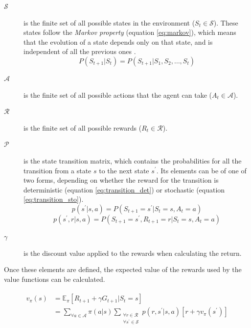 \begin{description}
    \item[$\mathcal{S}$] is the finite set of all possible states in the environment ($S_t \in \mathcal{S}$). These states follow the \textit{Markov property} (equation \ref{eq:markov}), which means that the evolution of a state depends only on that state, and is independent of all the previous ones \cite{Sutton:2018}.
    \begin{equation}
    \label{eq:markov}
        P(S_{t+1}|S_t) = P(S_{t+1}|S_1, S_2, \ldots, S_t)
    \end{equation}
    \item[$\mathcal{A}$] is the finite set of all possible actions that the agent can take ($A_t \in \mathcal{A}$).
    \item[$\mathcal{R}$] is the finite set of all possible rewards ($R_t \in \mathcal{R}$). 
    \item[$\mathcal{P}$] is the state transition matrix, which contains the probabilities for all the transition from a state $s$ to the next state $s^\prime$. Its elements can be of one of two forms, depending on whether the reward for the transition is deterministic (equation \ref{eq:transition_det}) or stochastic (equation \ref{eq:transition_sto}).
    \begin{equation}
    \label{eq:transition_det}
        p(s^\prime|s, a) = P(S_{t+1} = s^\prime|S_t = s, A_t = a)
    \end{equation}
    \begin{equation}
    \label{eq:transition_sto}
        p(s^\prime, r|s, a) = P(S_{t+1} = s^\prime, R_{t+1} = r|S_t = s, A_t = a)
    \end{equation}
    \item[$\gamma$] is the discount value applied to the rewards when calculating the return.
\end{description}

Once these elements are defined, the expected value of the rewards used by the value functions can be calculated.

\begin{align}
\begin{split}
    \label{eq:bellman_state}
    v_\pi(s) &= \mathbb{E}_\pi[R_{t+1} + \gamma G_{t+1}|S_t = s] \\
    &= \sum_{\forall a \in \mathcal{A}}{\pi(a|s)} \sum_{\substack{\forall r \in \mathcal{R} \\ \forall s^\prime \in \mathcal{S}}}{p(r,s^\prime|s,a)[r + \gamma v_\pi(s^\prime)]}
\end{split}
\end{align}

